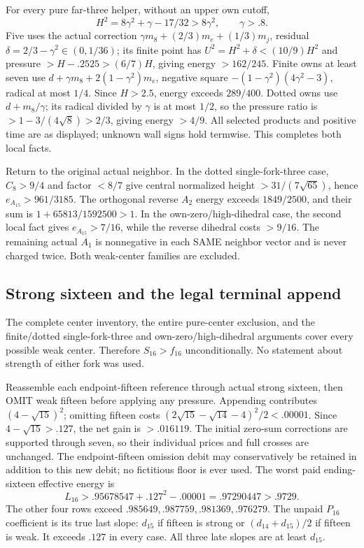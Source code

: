 For every pure far-three helper, without an upper own cutoff,
\[
 H^2=8\gamma^2+\gamma-17/32>8\gamma^2,\qquad \gamma>.8 .
\]
Five uses the actual correction
\(\gamma m_8+(2/3)m_e+(1/3)m_j\), residual
\(\delta=2/3-\gamma^2\in(0,1/36)\);
its finite point has \(U^2=H^2+\delta<(10/9)H^2\)
and pressure \(>H-.2525>(6/7)H\), giving energy \(>162/245\).
Finite owns at least seven use
\(d+\gamma m_8+2(1-\gamma^2)m_e\), negative square
\(-(1-\gamma^2)(4\gamma^2-3)\), radical at most \(1/4\).
Since \(H>2.5\), energy exceeds \(289/400\).
Dotted owns use \(d+m_8/\gamma\); its radical divided by
\(\gamma\) is at most \(1/2\), so the pressure ratio is
\(>1-3/(4\sqrt8)>2/3\), giving energy \(>4/9\).
All selected products and positive time are as displayed;
unknown wall signs hold termwise. This completes both local facts.

Return to the original actual neighbor.
In the dotted single-fork-three case, \(C_8>9/4\) and factor
\(<8/7\) give central normalized height
\(>31/(7\sqrt{65})\), hence \(e_{A_{15}}>961/3185\).
The orthogonal reverse \(A_2\) energy exceeds \(1849/2500\),
and their sum is
\(1+65813/1592500>1\).
In the own-zero/high-dihedral case, the second local fact gives
\(e_{A_{15}}>7/16\), while the reverse dihedral costs \(>9/16\).
The remaining actual \(A_1\) is nonnegative in each SAME neighbor
vector and is never charged twice.
Both weak-center families are excluded.

\subsection{Strong sixteen and the legal terminal append}
\label{app:D18strong16}
The complete center inventory, the entire pure-center exclusion,
and the finite/dotted single-fork-three and own-zero/high-dihedral
arguments cover every possible weak center.
Therefore \(S_{16}>f_{16}\) unconditionally.
No statement about strength of either fork was used.

Reassemble each endpoint-fifteen reference through actual strong sixteen,
then OMIT weak fifteen before applying any pressure.
Appending contributes \((4-\sqrt{15})^2\);
omitting fifteen costs
\((2\sqrt{15}-\sqrt{14}-4)^2/2<.00001\).
Since \(4-\sqrt{15}>.127\), the net gain is \(>.016119\).
The initial zero-sum corrections are supported through seven, so
their individual prices and full crosses are unchanged.
The endpoint-fifteen omission debit may conservatively be retained
in addition to this new debit; no fictitious floor is ever used.
The worst paid ending-sixteen effective energy is
\[
 L_{16}>.95678547+.127^2-.00001=.97290447>.9729 .
\]
The other four rows exceed
\(.985649,.987759,.981369,.976279\).
The unpaid \(P_{16}\) coefficient is its true last slope:
\(d_{15}\) if fifteen is strong or \((d_{14}+d_{15})/2\)
if fifteen is weak. It exceeds \(.127\) in every case.
All three late slopes are at least \(d_{15}\).

